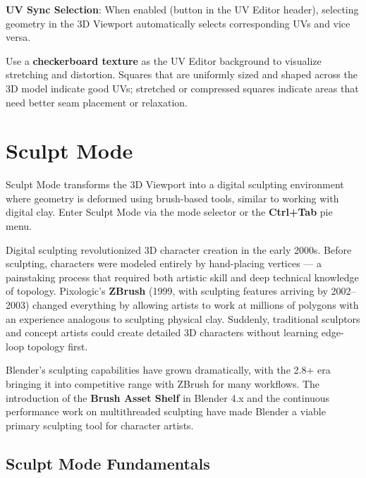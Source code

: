 \textbf{UV Sync Selection}: When enabled (button in the UV Editor header), selecting geometry in the 3D Viewport automatically selects corresponding UVs and vice versa.

\begin{tipbox}
Use a \textbf{checkerboard texture} as the UV Editor background to visualize stretching and distortion. Squares that are uniformly sized and shaped across the 3D model indicate good UVs; stretched or compressed squares indicate areas that need better seam placement or relaxation.
\end{tipbox}



\section{Sculpt Mode}
\label{sec:sculpt}

Sculpt Mode transforms the 3D Viewport into a digital sculpting environment where geometry is deformed using brush-based tools, similar to working with digital clay. Enter Sculpt Mode via the mode selector or the \textbf{Ctrl+Tab} pie menu.

\begin{historynote}
Digital sculpting revolutionized 3D character creation in the early 2000s. Before sculpting, characters were modeled entirely by hand-placing vertices --- a painstaking process that required both artistic skill and deep technical knowledge of topology. Pixologic's \textbf{ZBrush} (1999, with sculpting features arriving by 2002--2003) changed everything by allowing artists to work at millions of polygons with an experience analogous to sculpting physical clay. Suddenly, traditional sculptors and concept artists could create detailed 3D characters without learning edge-loop topology first.

Blender's sculpting capabilities have grown dramatically, with the 2.8+ era bringing it into competitive range with ZBrush for many workflows. The introduction of the \textbf{Brush Asset Shelf} in Blender 4.x and the continuous performance work on multithreaded sculpting have made Blender a viable primary sculpting tool for character artists.
\end{historynote}

\subsection{Sculpt Mode Fundamentals}
\label{sec:sculptfundamentals}

